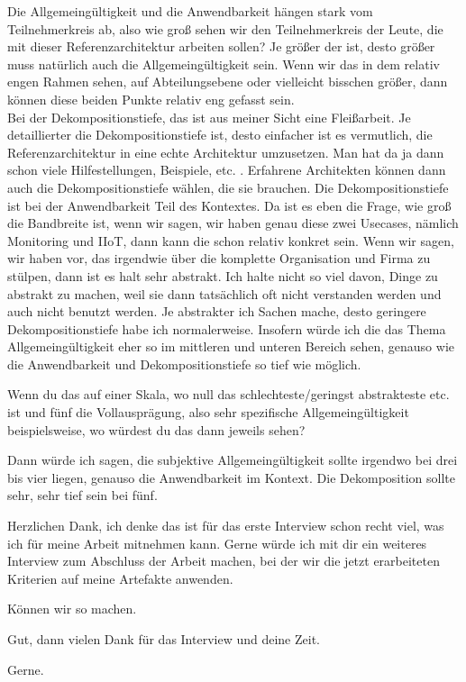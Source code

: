 \PA	 Die Allgemeingültigkeit und die Anwendbarkeit hängen stark vom Teilnehmerkreis ab, also wie groß sehen wir den Teilnehmerkreis der Leute, die mit dieser Referenzarchitektur arbeiten sollen? Je größer der ist, desto größer muss natürlich auch die Allgemeingültigkeit sein. Wenn wir das in dem relativ engen Rahmen sehen, auf Abteilungsebene oder vielleicht bisschen größer, dann können diese beiden Punkte relativ eng gefasst sein. \\
Bei der Dekompositionstiefe, das ist aus meiner Sicht eine Fleißarbeit. Je detaillierter die Dekompositionstiefe ist, desto einfacher ist es vermutlich, die Referenzarchitektur in eine echte Architektur umzusetzen. Man hat da ja dann schon viele Hilfestellungen, Beispiele, etc. . Erfahrene Architekten können dann auch die Dekompositionstiefe wählen, die sie brauchen. Die Dekompositionstiefe ist bei der Anwendbarkeit Teil des Kontextes. Da ist es eben die Frage, wie groß die Bandbreite ist, wenn wir sagen, wir haben genau diese zwei Usecases, nämlich Monitoring und \ac{IIoT}, dann kann die schon relativ konkret sein. Wenn wir sagen, wir haben vor, das irgendwie über die komplette Organisation und Firma zu stülpen, dann ist es halt sehr abstrakt. Ich halte nicht so viel davon, Dinge zu abstrakt zu machen, weil sie dann tatsächlich oft nicht verstanden werden und auch nicht benutzt werden. Je abstrakter ich Sachen mache, desto geringere Dekompositionstiefe habe ich normalerweise. Insofern würde ich die das Thema Allgemeingültigkeit eher so im mittleren und unteren Bereich sehen, genauso wie die Anwendbarkeit und Dekompositionstiefe so tief wie möglich.

\LF	Wenn du das auf einer Skala, wo null das schlechteste/geringst abstrakteste etc. ist und fünf die Vollausprägung, also sehr spezifische Allgemeingültigkeit beispielsweise, wo würdest du das dann jeweils sehen?

\PA	 Dann würde ich sagen, die subjektive Allgemeingültigkeit sollte irgendwo bei drei bis vier liegen, genauso die Anwendbarkeit im Kontext. Die Dekomposition sollte sehr, sehr tief sein bei fünf.

\LF	 Herzlichen Dank, ich denke das ist für das erste Interview schon recht viel, was ich für meine Arbeit mitnehmen kann. Gerne würde ich mit dir ein weiteres Interview zum Abschluss der Arbeit machen, bei der wir die jetzt erarbeiteten Kriterien auf meine Artefakte anwenden.

\PA	 Können wir so machen.

\LF	Gut, dann vielen Dank für das Interview und deine Zeit.

\PA	 Gerne.